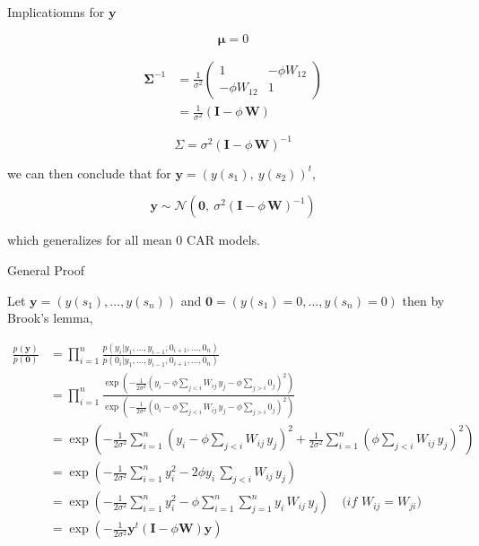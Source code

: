 \documentclass[11pt,ignorenonframetext,]{beamer}
\begin{document}
\begin{frame}{Implicatiomns for \(\bm{y}\)}

\vspace{-3mm}

\[ \bm{\mu} = 0 \]

\[
\begin{aligned}
\bm{\Sigma}^{-1} &= \frac{1}{\sigma^2}
  \begin{pmatrix} 
    1 & -\phi W_{12} \\
    -\phi W_{12} & 1
  \end{pmatrix} \\
  &= \frac{1}{\sigma^2}(\bm{I} - \phi \, \bm{W})
\end{aligned}
\]

\[
\Sigma = \sigma^2(\bm{I} - \phi \, \bm{W})^{-1}
\]

\pause

we can then conclude that for \(\bm{y} = (y(s_1),~y(s_2))^t\),

\[
\bm{y} \sim \mathcal{N}\left(
\bm{0}, ~
\sigma^2 (\bm{I} - \phi \, \bm{W})^{-1}
\right)
\]

which generalizes for all mean 0 CAR models.

\end{frame}

\begin{frame}{General Proof}

Let \(\bm{y} = (y(s_1),\ldots,y(s_n))\) and
\(\bm{0} = (y(s_1) = 0, \ldots, y(s_n)=0)\) then by Brook's lemma,

\scriptsize

\[\begin{aligned}
\frac{p(\bm{y})}{p(\bm{0})} 
  &= \prod_{i=1}^n \frac{p(y_i|y_1,\ldots,y_{i-1},0_{i+1},\ldots,0_{n})}{p(0_i|y_1,\ldots,y_{i-1},0_{i+1},\ldots,0_{n})} \\
  &= \prod_{i=1}^n 
    \frac{
      \exp\left(-\frac{1}{2\sigma^2} \left(y_i - \phi \sum_{j<i} W_{ij} \, y_j - \phi \sum_{j>i} 0_j \right)^2 \right)
    }{
      \exp\left(-\frac{1}{2\sigma^2} \left(0_i - \phi \sum_{j<i} W_{ij} \, y_j - \phi \sum_{j>i} 0_j \right)^2 \right)
    } \\
  &= \exp\left(-\frac{1}{2\sigma^2} \sum_{i=1}^n \left(y_i - \phi \sum_{j<i} W_{ij} \, y_j\right)^2 + \frac{1}{2\sigma^2} \sum_{i=1}^n \left( \phi \sum_{j<i} W_{ij} \, y_j \right)^2 \right) \\
  &= \exp\left(-\frac{1}{2\sigma^2} \sum_{i=1}^n y_i^2 - 2 \phi y_i \,\sum_{j<i} W_{ij} \, y_j \right) \\
  &= \exp\left(-\frac{1}{2\sigma^2} \sum_{i=1}^n y_i^2 - \phi \sum_{i=1}^n \sum_{j=1}^n y_i \, W_{ij} \, y_j \right) \quad \mathit{\big(\text{if } W_{ij} = W_{ji}\big)} \\
  &= \exp\left(-\frac{1}{2\sigma^2} \bm{y}^t (\bm{I} - \phi \bm{W}) \bm{y}  \right)
\end{aligned}\]

\end{frame}
\end{document}
